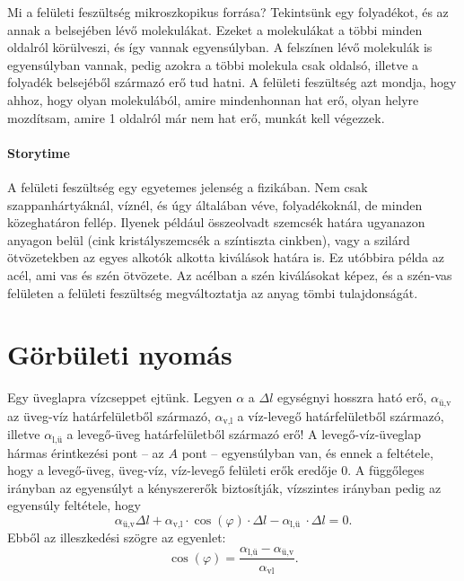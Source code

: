 \documentclass[12pt,a4paper]{scrartcl}
\begin{document}
Mi a felületi feszültség mikroszkopikus forrása? Tekintsünk egy folyadékot, és az annak a belsejében lévő molekulákat. Ezeket a molekulákat a többi minden oldalról körülveszi, és így vannak egyensúlyban. A felszínen lévő molekulák is egyensúlyban vannak, pedig azokra a többi molekula csak oldalsó, illetve a folyadék belsejéből származó erő tud hatni. A felületi feszültség azt mondja, hogy ahhoz, hogy olyan molekulából, amire mindenhonnan hat erő, olyan helyre mozdítsam, amire 1 oldalról már nem hat erő, munkát kell végezzek.

\footnotesize
\paragraph{Storytime} A felületi feszültség egy egyetemes jelenség a fizikában. Nem csak szappanhártyáknál, víznél, és úgy általában véve, folyadékoknál, de minden közeghatáron fellép. Ilyenek például összeolvadt szemcsék határa ugyanazon anyagon belül (cink kristályszemcsék a színtiszta cinkben), vagy a szilárd ötvözetekben az egyes alkotók alkotta kiválások határa is. Ez utóbbira példa az acél, ami vas és szén ötvözete. Az acélban a szén kiválásokat képez, és a szén-vas felületen a felületi feszültség megváltoztatja az anyag tömbi tulajdonságát.

\normalsize

\section{Görbületi nyomás}

Egy üveglapra vízcseppet ejtünk. Legyen $\alpha$ a $\Delta l$ egységnyi hosszra ható erő, $\alpha_{\text{ü,v}}$ az üveg-víz határfelületből származó, $\alpha_{\text{v,l}}$ a víz-levegő határfelületből származó, illetve $\alpha_{\text{l,ü}}$ a levegő-üveg határfelületből származó erő! A levegő-víz-üveglap hármas érintkezési pont -- az $A$ pont -- egyensúlyban van, és ennek a feltétele, hogy a levegő-üveg, üveg-víz, víz-levegő felületi erők eredője 0. A függőleges irányban az egyensúlyt a kényszererők biztosítják, vízszintes irányban pedig az egyensúly feltétele, hogy 
\[{\alpha _{{\text{ü,v}}}}\Delta l + {\alpha _{{\text{v,l}}}} \cdot \cos \left( \varphi  \right) \cdot \Delta l - {\alpha _{{\text{l,ü }}}} \cdot \Delta l = 0.\]
Ebből az illeszkedési szögre az egyenlet:
\begin{equation} \label{eq:illeszkedesi_szog}
\cos{{\left( \varphi  \right)}}=\frac{\alpha_{\text{l,ü}}-\alpha_{\text{ü,v}}}{\alpha_{\text{vl}}}.
\end{equation}
\end{document}
